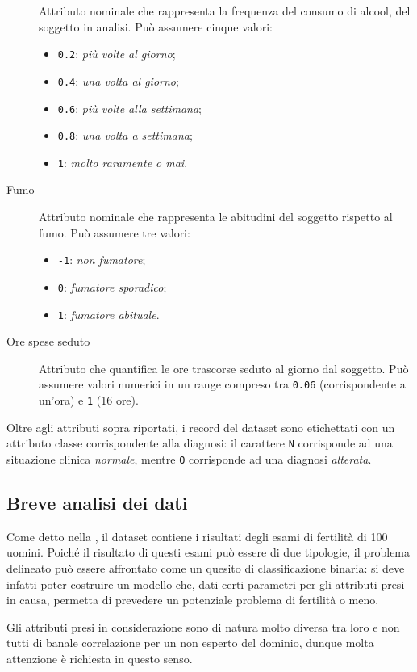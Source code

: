 \begin{description}
    Attributo nominale che rappresenta la frequenza del consumo di alcool, del soggetto in analisi.
    Può assumere cinque valori:
    \begin{itemize}
      \item \texttt{0.2}: \emph{più volte al giorno};
      \item \texttt{0.4}: \emph{una volta al giorno};
      \item \texttt{0.6}: \emph{più volte alla settimana};
      \item \texttt{0.8}: \emph{una volta a settimana};
      \item \texttt{1}: \emph{molto raramente o mai}.
    \end{itemize}
  \item[Fumo]
    Attributo nominale che rappresenta le abitudini del soggetto rispetto al fumo.
    Può assumere tre valori:
    \begin{itemize}
      \item \texttt{-1}: \emph{non fumatore};
      \item \texttt{0}: \emph{fumatore sporadico};
      \item \texttt{1}: \emph{fumatore abituale}.
    \end{itemize}
  \item[Ore spese seduto]
    Attributo che quantifica le ore trascorse seduto al giorno dal soggetto.
    Può assumere valori numerici in un range compreso tra \texttt{0.06} (corrispondente a un'ora) e \texttt{1} (16 ore).
  \end{description}

Oltre agli attributi sopra riportati, i record del dataset sono etichettati con un attributo classe corrispondente alla diagnosi:
il carattere \texttt{N} corrisponde ad una situazione clinica \emph{normale}, mentre \texttt{O} corrisponde ad una diagnosi \emph{alterata}.

\subsection{Breve analisi dei dati}\label{subsec:intro:analysis}

Come detto nella , il dataset contiene i risultati degli esami di fertilità di 100 uomini.
Poiché il risultato di questi esami può essere di due tipologie, il problema delineato può essere affrontato come un quesito di classificazione binaria:
si deve infatti poter costruire un modello che, dati certi parametri per gli attributi presi in causa, permetta di prevedere un potenziale problema di fertilità o meno.

Gli attributi presi in considerazione sono di natura molto diversa tra loro e non tutti di banale correlazione per un non esperto del dominio, dunque molta attenzione è richiesta in questo senso.
